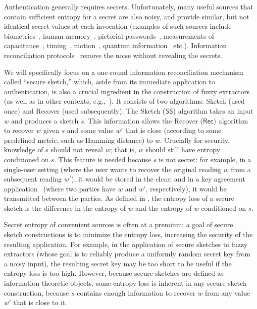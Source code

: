 \documentclass[11pt]{article}
\newcommand{\class}[1]{{\ensuremath{\mathsf{#1}}}}
\newcommand{\sketch}{\ensuremath{\class{SS}}\xspace}
\newcommand{\rec}{\ensuremath{\class{Rec}}\xspace}
\begin{document}
Authentication generally requires secrets.  Unfortunately, many useful  sources that contain sufficient entropy for a secret  are also noisy, and provide similar, but not identical secret values at each invocation (examples of such sources include biometrics~\cite{daugman2004}, human memory~\cite{zviran1993comparison}, pictorial passwords~\cite{brostoff2000passfaces}, measurements of capacitance~\cite{tuyls2006puf}, timing~\cite{suh2007physical}, motion~\cite{castelluccia2005shake},  quantum information~\cite{bennett1988privacy} etc.).  Information reconciliation protocols~\cite{bennett1988privacy} remove the noise without revealing the secrets.

We will specifically focus on a one-round information reconciliation  mechanism called ``secure sketch,''  which, aside from its immediate application to authentication, is also
a crucial ingredient in the construction of fuzzy extractors~\cite{DBLP:journals/siamcomp/DodisORS08} (as well as in other contexts, e.g.,~\cite{Boyen05secureremote,dodisWichs2009,chandran2010privacy}).
It consists of  two algorithms: Sketch (used once) and Recover (used subsequently).  The Sketch ($\sketch$) algorithm takes an input $w$ and produces a sketch $s$.  This information allows
the Recover ($\rec$) algorithm to recover $w$ given $s$ and some value $w'$ that is close (according to some predefined metric, such as Hamming distance) to $w$. 
Crucially for security,  knowledge of $s$ should not reveal $w$; that is, $w$ should still have entropy  conditioned on $s$.  This feature is needed because $s$ is not secret: for example, in a single-user setting (where the user wants to recover the original reading $w$ from a subsequent reading $w'$), it would be stored in the clear; and in a key agreement application~\cite{Boyen05secureremote} (where two parties have $w$ and $w'$, respectively), it would be transmitted between the parties.
As defined in \cite{DBLP:journals/siamcomp/DodisORS08}, the entropy loss of a secure sketch is the difference in the entropy of $w$ and the entropy of $w$ conditioned on $s$.  

Secret entropy of convenient sources is often at a premium; a goal of secure sketch constructions is to minimize the entropy loss, increasing the security of the resulting application. For example, in the application of secure sketches to fuzzy extractors (whose goal is to reliably produce a uniformly random secret key from a noisy input), the resulting secret key may be too short to be useful if the entropy loss is too high. However, because secure sketches are defined as information-theoretic objects, some entropy loss is inherent in any secure sketch construction, because $s$ contains enough information to recover $w$ from any value $w'$ that is close to it.  
\end{document}

